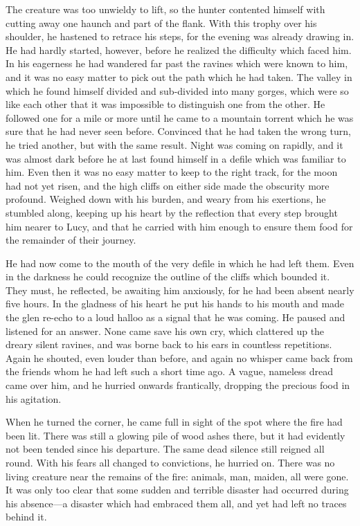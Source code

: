 The creature was too unwieldy to lift, so the hunter contented himself with cutting away one haunch and part of the flank. With this trophy over his shoulder, he hastened to retrace his steps, for the evening was already drawing in. He had hardly started, however, before he realized the difficulty which faced him. In his eagerness he had wandered far past the ravines which were known to him, and it was no easy matter to pick out the path which he had taken. The valley in which he found himself divided and sub-divided into many gorges, which were so like each other that it was impossible to distinguish one from the other. He followed one for a mile or more until he came to a mountain torrent which he was sure that he had never seen before. Convinced that he had taken the wrong turn, he tried another, but with the same result. Night was coming on rapidly, and it was almost dark before he at last found himself in a defile which was familiar to him. Even then it was no easy matter to keep to the right track, for the moon had not yet risen, and the high cliffs on either side made the obscurity more profound. Weighed down with his burden, and weary from his exertions, he stumbled along, keeping up his heart by the reflection that every step brought him nearer to Lucy, and that he carried with him enough to ensure them food for the remainder of their journey.

He had now come to the mouth of the very defile in which he had left them. Even in the darkness he could recognize the outline of the cliffs which bounded it. They must, he reflected, be awaiting him anxiously, for he had been absent nearly five hours. In the gladness of his heart he put his hands to his mouth and made the glen re-echo to a loud halloo as a signal that he was coming. He paused and listened for an answer. None came save his own cry, which clattered up the dreary silent ravines, and was borne back to his ears in countless repetitions. Again he shouted, even louder than before, and again no whisper came back from the friends whom he had left such a short time ago. A vague, nameless dread came over him, and he hurried onwards frantically, dropping the precious food in his agitation.

When he turned the corner, he came full in sight of the spot where the fire had been lit. There was still a glowing pile of wood ashes there, but it had evidently not been tended since his departure. The same dead silence still reigned all round. With his fears all changed to convictions, he hurried on. There was no living creature near the remains of the fire: animals, man, maiden, all were gone. It was only too clear that some sudden and terrible disaster had occurred during his absence—a disaster which had embraced them all, and yet had left no traces behind it.

